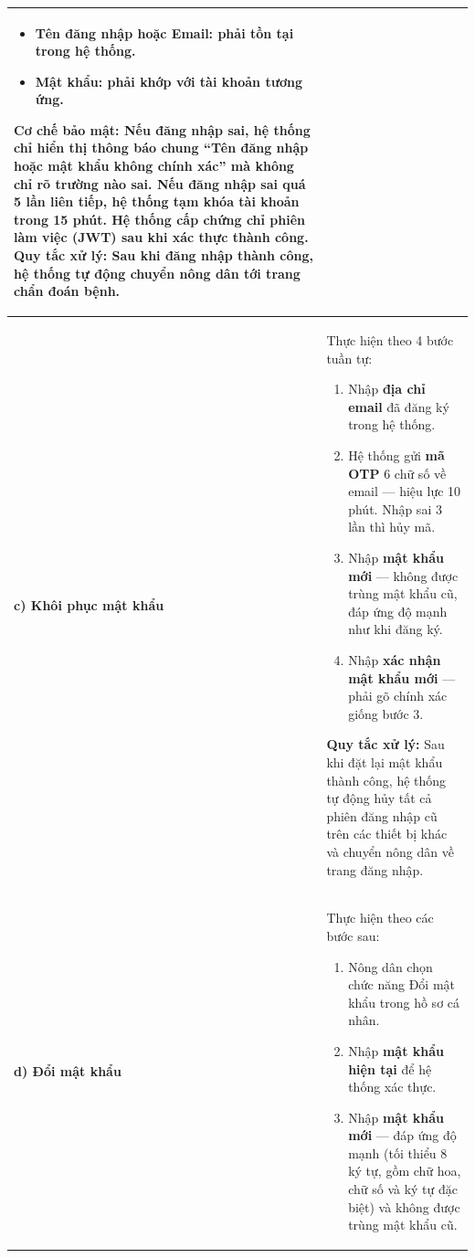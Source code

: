 \documentclass[12pt,a4paper]{article}
\begin{document}
\begin{longtable}{|
        >{\raggedright\arraybackslash}p{2.8cm}|
        >{\raggedright\arraybackslash}p{12cm}|}
\begin{itemize}[leftmargin=*,topsep=2pt,itemsep=1pt]
        \item \textbf{Tên đăng nhập hoặc Email:} phải tồn tại trong hệ thống.
        \item \textbf{Mật khẩu:} phải khớp với tài khoản tương ứng.
    \end{itemize}
    \textbf{Cơ chế bảo mật:} Nếu đăng nhập sai, hệ thống chỉ hiển thị thông báo chung ``Tên đăng nhập hoặc mật khẩu không chính xác'' mà không chỉ rõ trường nào sai. Nếu đăng nhập sai quá 5 lần liên tiếp, hệ thống tạm khóa tài khoản trong 15 phút. Hệ thống cấp chứng chỉ phiên làm việc (JWT) sau khi xác thực thành công. \newline
    \textbf{Quy tắc xử lý:} Sau khi đăng nhập thành công, hệ thống tự động chuyển nông dân tới trang chẩn đoán bệnh.                                                                                                                                                       \\
    \hline
    \textbf{c) Khôi phục mật khẩu} &
    Thực hiện theo 4 bước tuần tự:
    \begin{enumerate}[leftmargin=*,topsep=2pt,itemsep=1pt]
        \item Nhập \textbf{địa chỉ email} đã đăng ký trong hệ thống.
        \item Hệ thống gửi \textbf{mã OTP} 6 chữ số về email --- hiệu lực 10 phút. Nhập sai 3 lần thì hủy mã.
        \item Nhập \textbf{mật khẩu mới} --- không được trùng mật khẩu cũ, đáp ứng độ mạnh như khi đăng ký.
        \item Nhập \textbf{xác nhận mật khẩu mới} --- phải gõ chính xác giống bước 3.
    \end{enumerate}
    \textbf{Quy tắc xử lý:} Sau khi đặt lại mật khẩu thành công, hệ thống tự động hủy tất cả phiên đăng nhập cũ trên các thiết bị khác và chuyển nông dân về trang đăng nhập.                                                                                              \\
    \hline
    \textbf{d) Đổi mật khẩu}       &
    Thực hiện theo các bước sau:
    \begin{enumerate}[leftmargin=*,topsep=2pt,itemsep=1pt]
        \item Nông dân chọn chức năng Đổi mật khẩu trong hồ sơ cá nhân.
        \item Nhập \textbf{mật khẩu hiện tại} để hệ thống xác thực.
        \item Nhập \textbf{mật khẩu mới} --- đáp ứng độ mạnh (tối thiểu 8 ký tự, gồm chữ hoa, chữ số và ký tự đặc biệt) và không được trùng mật khẩu cũ.

\end{enumerate}
\end{longtable}
\end{document}
